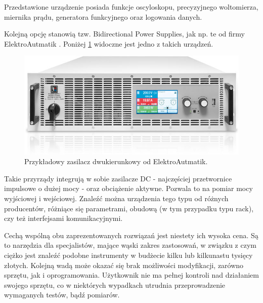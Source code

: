 Przedstawione urządzenie posiada funkcje oscyloskopu, precyzyjnego woltomierza, miernika prądu, generatora funkcyjnego oraz logowania danych.

Kolejną opcję stanowią tzw. Bidirectional Power Supplies, jak np. te od firmy ElektroAutmatik \cite{bidirectional_DC_PSU}. 
Poniżej \ref{fig:ElektroAutomatik} widoczne jest jedno z takich urządzeń.


\begin{figure}[h!]
    \centering
 \includegraphics[width = 15cm]{images/elektroautomatik.jpg}
 \caption{Przykładowy zasilacz dwukierunkowy od ElektroAutmatik.}
 \label{fig:ElektroAutomatik}
\end{figure}

Takie przyrządy integrują w sobie zasilacze DC - najczęściej przetwornice impulsowe o dużej mocy - oraz obciążenie aktywne.
Pozwala to na pomiar mocy wyjściowej i wejściowej. Znaleźć można urządzenia tego typu od różnych producentów, różniące się parametrami, obudową (w tym przypadku typu rack), czy też interfejsami komunikacyjnymi.

Cechą wspólną obu zaprezentowanych rozwiązań jest niestety ich wysoka cena. Są to narzędzia dla specjalistów, mające wąski zakres zastosowań, w związku z czym ciężko jest znaleźć podobne instrumenty w budżecie kilku lub kilkunastu tysięcy złotych.
Kolejną wadą może okazać się brak możliwości modyfikacji, zarówno sprzętu, jak i oprogramowania. Użytkownik nie ma pełnej kontroli nad działaniem swojego sprzętu, co w niektórych wypadkach utrudnia przeprowadzenie wymaganych testów, bądź pomiarów.




